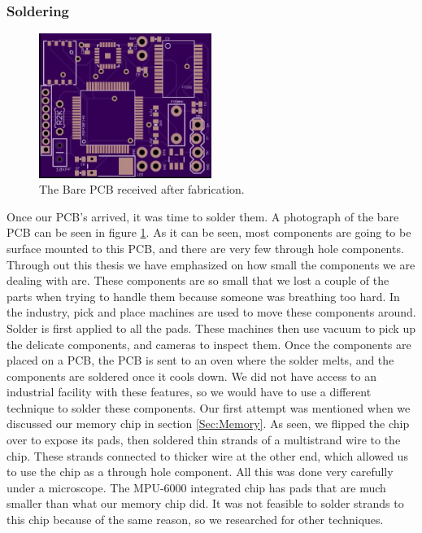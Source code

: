\subsubsection{Soldering}
\label{Sec:Soldering}
\begin{figure}
\begin{center}
\includegraphics[width=0.5\textwidth]{images/PCBBare.jpg}
\caption{The Bare PCB received after fabrication.}
\label{Fig:PCBBare}
\end{center}
\end{figure}
Once our PCB's arrived, it was time to solder them.
A photograph of the bare PCB can be seen in figure \ref{Fig:PCBBare}.
As it can be seen,
most components are going to be surface mounted to this PCB,
and there are very few through hole components.
Through out this thesis we have emphasized on how small the components we are dealing with are.
These components are so small that we lost a couple of the parts when trying to handle them because someone was breathing too hard.
In the industry,
pick and place machines are used to move these components around.
Solder is first applied to all the pads.
These machines then use vacuum to pick up the delicate components,
and cameras to inspect them. 
Once the components are placed on a PCB,
the PCB is sent to an oven where the solder melts,
and the components are soldered once it cools down.
We did not have access to an industrial facility with these features,
so we would have to use a different technique to solder these components.
Our first attempt was mentioned when we discussed our memory chip in section \ref{Sec:Memory}.
As seen, we flipped the chip over to expose its pads,
then soldered thin strands of a multistrand wire to the chip.
These strands connected to thicker wire at the other end,
which allowed us to use the chip as a through hole component.
All this was done very carefully under a microscope.
The MPU-6000 integrated chip has pads that are much smaller than what our memory chip did.
It was not feasible to solder strands to this chip because of the same reason,
so we researched for other techniques.

